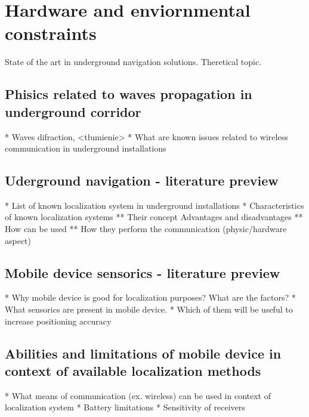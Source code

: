 \documentclass[../main.tex]{subfiles}
\begin{document}
\chapter{Hardware and enviornmental constraints}
State of the art in underground navigation solutions. Theretical topic.

\section{Phisics related to waves propagation in underground corridor}

* Waves difraction, <tłumienie>
* What are known issues related to wireless communication in underground installations


\section{Uderground navigation - literature preview}
* List of known localization system in underground installations
* Characteristics of known localization systems
** Their concept Advantages and disadvantages
** How can be used
** How they perform the communication (physic/hardware aspect)

\section{Mobile device sensorics - literature preview}
* Why mobile device is good for localization purposes? What are the factors?
* What sensorics are present in mobile device.
* Which of them will be useful to increase positioning accuracy

\section{Abilities and limitations of mobile device in context of available localization methods}
* What means of communication (ex. wireless) can be used in context of localization system
* Battery limitations
* Sensitivity of receivers
\end{document}

